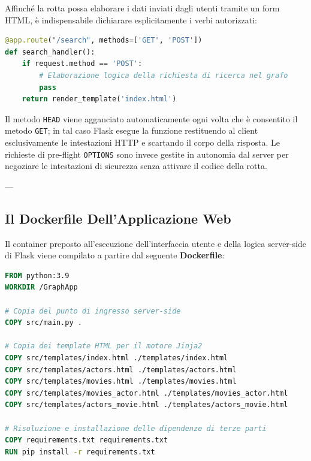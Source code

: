 \documentclass[11pt, a4paper]{article}
\begin{document}
Affinché la rotta possa elaborare i dati inviati dagli utenti tramite un form HTML, è indispensabile dichiarare esplicitamente i verbi autorizzati:
\begin{lstlisting}[language=python]
@app.route("/search", methods=['GET', 'POST'])
def search_handler():
    if request.method == 'POST':
        # Elaborazione logica della richiesta di ricerca nel grafo
        pass
    return render_template('index.html')
\end{lstlisting}
Il metodo \texttt{HEAD} viene agganciato automaticamente ogni volta che è consentito il metodo \texttt{GET}; in tal caso Flask esegue la funzione restituendo al client esclusivamente le intestazioni HTTP e scartando il corpo della risposta. Le richieste di pre-flight \texttt{OPTIONS} sono invece gestite in autonomia dal server per negoziare le intestazioni di sicurezza senza attivare il codice della rotta.

---

\subsection{Il Dockerfile Dell'Applicazione Web}

Il container preposto all'esecuzione dell'interfaccia utente e della logica server-side di Flask viene compilato a partire dal seguente \textbf{Dockerfile}:

\begin{lstlisting}[language=dockerfile]
FROM python:3.9
WORKDIR /GraphApp

# Copia del punto di ingresso server-side
COPY src/main.py .

# Copia dei template HTML per il motore Jinja2
COPY src/templates/index.html ./templates/index.html
COPY src/templates/actors.html ./templates/actors.html
COPY src/templates/movies.html ./templates/movies.html
COPY src/templates/movies_actor.html ./templates/movies_actor.html
COPY src/templates/actors_movie.html ./templates/actors_movie.html

# Risoluzione e installazione delle dipendenze di terze parti
COPY requirements.txt requirements.txt
RUN pip install -r requirements.txt
\end{lstlisting}
\end{document}
